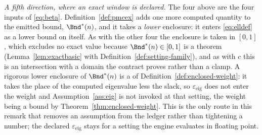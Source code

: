 \begin{remark}
\emph{A fifth direction, where an exact window is declared.} The four above
are the four inputs of \eqref{eq:beta}. Definition~\ref{def:pmcex} adds one
more computed quantity to the emitted bound, $\Bnd^{\ast}(n)$, and it takes a
\emph{lower} enclosure: it enters \eqref{eq:elldef} as a lower bound on
itself. As with the other four the enclosure is taken in $[0,1]$, which
excludes no exact value because $\Bnd^{\ast}(n)\in[0,1]$ is a theorem
(Lemma~\ref{lem:exactbasic} with Definition~\ref{def:setting-family}), and
as with $c$ this is an intersection with a
domain the contract proves rather than a clamp. A rigorous lower enclosure of
$\Bnd^{\ast}(n)$ is a  of
Definition~\ref{def:enclosed-weight}: it takes the place of the computed
eigenvalue less the slack, so $\varepsilon_{\mathrm{eig}}$ does not enter the
weight and Assumption~\ref{ass:eig} is not invoked at that setting, the
weight being a bound by Theorem~\ref{thm:enclosed-weight}. This is the only
route in this remark that removes an assumption from the ledger rather than
tightening a number; the declared $\varepsilon_{\mathrm{eig}}$ stays for a
setting the engine evaluates in floating point.
\end{remark}

